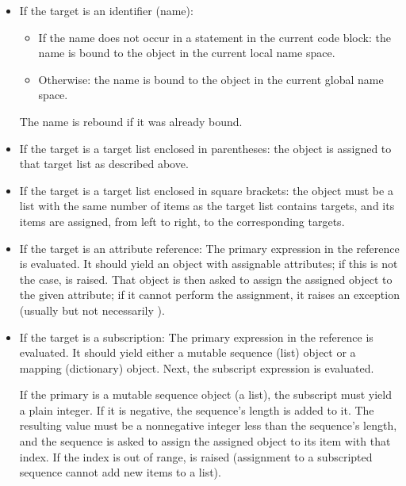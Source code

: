 \begin{itemize} %

\item
If the target is an identifier (name):

\begin{itemize}

\item
If the name does not occur in a  statement in the current
code block: the name is bound to the object in the current local name
space.

\item
Otherwise: the name is bound to the object in the current global name
space.

\end{itemize} %

The name is rebound if it was already bound.

\item
If the target is a target list enclosed in parentheses: the object is
assigned to that target list as described above.

\item
If the target is a target list enclosed in square brackets: the object
must be a list with the same number of items as the target list
contains targets, and its items are assigned, from left to right, to
the corresponding targets.

\item
If the target is an attribute reference: The primary expression in the
reference is evaluated.  It should yield an object with assignable
attributes; if this is not the case,  is raised.  That
object is then asked to assign the assigned object to the given
attribute; if it cannot perform the assignment, it raises an exception
(usually but not necessarily ).

\item
If the target is a subscription: The primary expression in the
reference is evaluated.  It should yield either a mutable sequence
(list) object or a mapping (dictionary) object.  Next, the subscript
expression is evaluated.

If the primary is a mutable sequence object (a list), the subscript
must yield a plain integer.  If it is negative, the sequence's length
is added to it.  The resulting value must be a nonnegative integer
less than the sequence's length, and the sequence is asked to assign
the assigned object to its item with that index.  If the index is out
of range,  is raised (assignment to a subscripted
sequence cannot add new items to a list).


\end{itemize}
